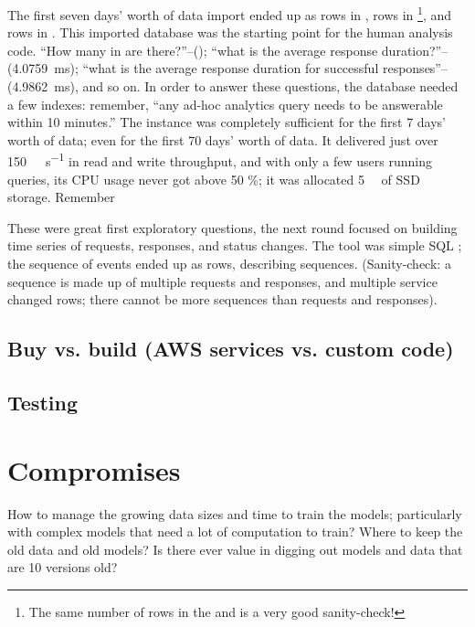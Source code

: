 The first seven days' worth of data import ended up as  rows in ,  rows in \footnote{The same number of rows in the  and  is a very good sanity-check!}, and  rows in . This imported database was the starting point for the human analysis code. ``How many  in  are there?''--(); ``what is the average response duration?''--(\SI{4.0759}{\milli\second}); ``what is the average response duration for successful responses''--(\SI{4.9862}{\milli\second}), and so on. In order to answer these questions, the database needed a few indexes: remember, ``any ad-hoc analytics query needs to be answerable within 10 minutes.'' The  instance was completely sufficient for the first 7 days' worth of data; even for the first 70 days' worth of data. It delivered just over \SI{150}{\mebi\byte\per\second} in read and write throughput, and with only a few users running queries, its CPU usage never got above 50 \%; it was allocated \SI{5}{\tebi\byte} of SSD storage. Remember


These were great first exploratory questions, the next round focused on building time series of requests, responses, and status changes. The tool was simple SQL ; the sequence of events ended up as  rows, describing  sequences. (Sanity-check: a sequence is made up of multiple requests and responses, and multiple service changed rows; there cannot be more sequences than requests and responses).

\subsection{Buy vs. build (AWS services vs. custom code)}


\subsection{Testing}

\section{Compromises}
How to manage the growing data sizes and time to train the models; particularly with complex models that need a lot of computation to train? Where to keep the old data and old models? Is there ever value in digging out models and data that are 10 versions old?

\printbibliography



